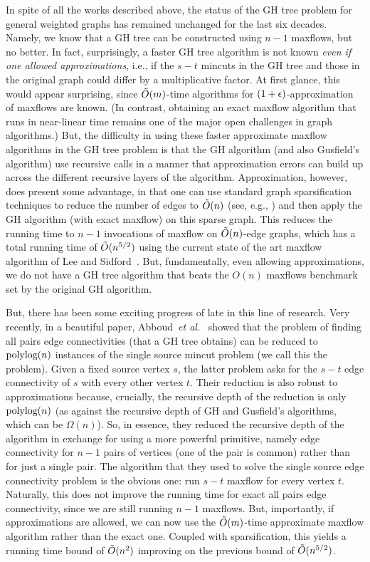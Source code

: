 In spite of all the works described above, the status of the GH tree problem for general weighted graphs has remained unchanged for the last six decades. Namely, we know that a GH tree can be constructed using $n-1$ maxflows, but no better. In fact, surprisingly, a faster GH tree algorithm is not known {\em even if one allowed approximations}, i.e., if the $s-t$ mincuts in the GH tree and those in the original graph could differ by a multiplicative factor. At first glance, this would appear surprising, since $\tilde{O}(m)$-time algorithms for  $(1+\epsilon)$-approximation of maxflows are known. (In contrast, obtaining an exact maxflow algorithm that runs in near-linear time remains one of the major open challenges in graph algorithms.) But, the difficulty in using these faster approximate maxflow algorithms in the GH tree problem is that the GH algorithm (and also Gusfield's algorithm) use recursive calls in a manner that approximation errors can build up across the different recursive layers of the algorithm. Approximation, however, does present some advantage, in that one can use standard graph sparsification techniques to reduce the number of edges to $\tilde{O}(n)$ (see, e.g., \cite{BenczurK00,FungHKP11}) and then apply the GH algorithm (with exact maxflow) on this sparse graph. This reduces the running time to $n-1$ invocations of maxflow on $\tilde{O}(n)$-edge graphs, which has a total running time of $\tilde{O}(n^{5/2})$ using the current state of the art maxflow algorithm of Lee and Sidford~\cite{Lees14}. But, fundamentally, even allowing approximations, we do not have a GH tree algorithm that beats the $O(n)$ maxflows benchmark set by the original GH algorithm.

But, there has been some exciting progress of late in this line of research. Very recently, in a beautiful paper, Abboud~{\em et al.}~\cite{AbboudKT20b} showed that the problem of finding all pairs edge connectivities (that a GH tree obtains) can be reduced to $\textup{polylog}(n)$ instances of the single source mincut problem (we call this the \ssc problem). Given a fixed source vertex $s$, the latter problem asks for the $s-t$ edge connectivity of $s$ with every other vertex $t$. Their reduction is also robust to approximations because, crucially, the recursive depth of the reduction is only $\textup{polylog}(n)$ (as against the recursive depth of GH and Gusfield's algorithms, which can be $\Omega(n)$). So, in essence, they reduced the recursive depth of the algorithm in exchange for using a more powerful primitive, namely edge connectivity for $n-1$ pairs of vertices (one of the pair is common) rather than for just a single pair. The algorithm that they used to solve the single source edge connectivity problem is the obvious one: run $s-t$ maxflow for every vertex $t$. Naturally, this does not improve the running time for exact all pairs edge connectivity, since we are still running $n-1$ maxflows. But, importantly, if approximations are allowed, we can now use the $\tilde{O}(m)$-time approximate maxflow algorithm rather than the exact one. Coupled with sparsification, this yields a running time bound of $\tilde{O}(n^2)$ improving on the previous bound of $\tilde{O}(n^{5/2})$. 

